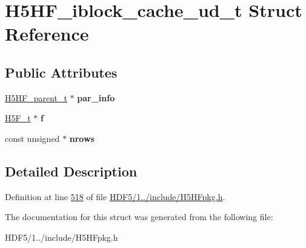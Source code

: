 \hypertarget{struct_h5_h_f__iblock__cache__ud__t}{}\section{H5\+H\+F\+\_\+iblock\+\_\+cache\+\_\+ud\+\_\+t Struct Reference}
\label{struct_h5_h_f__iblock__cache__ud__t}
\subsection*{Public Attributes}
\begin{DoxyCompactItemize}
\item 
\mbox{\label{struct_h5_h_f__iblock__cache__ud__t_a1db796886329a12e8230444c2fba49b5}} 
\hyperlink{struct_h5_h_f__parent__t}{H5\+H\+F\+\_\+parent\+\_\+t} $\ast$ {\bfseries par\+\_\+info}
\item 
\mbox{\label{struct_h5_h_f__iblock__cache__ud__t_a9765851015d063668f6a1ece51655526}} 
\hyperlink{struct_h5_f__t}{H5\+F\+\_\+t} $\ast$ {\bfseries f}
\item 
\mbox{\label{struct_h5_h_f__iblock__cache__ud__t_ab7b7e028fe37d3a367883bcf3a3c897b}} 
const unsigned $\ast$ {\bfseries nrows}
\end{DoxyCompactItemize}


\subsection{Detailed Description}


Definition at line \hyperlink{_h_d_f5_21_810_81_2include_2_h5_h_fpkg_8h_source_l00518}{518} of file \hyperlink{_h_d_f5_21_810_81_2include_2_h5_h_fpkg_8h_source}{H\+D\+F5/1../include/\+H5\+H\+Fpkg.\+h}.



The documentation for this struct was generated from the following file\+:\begin{DoxyCompactItemize}
\item 
H\+D\+F5/1../include/\+H5\+H\+Fpkg.\+h\end{DoxyCompactItemize}

